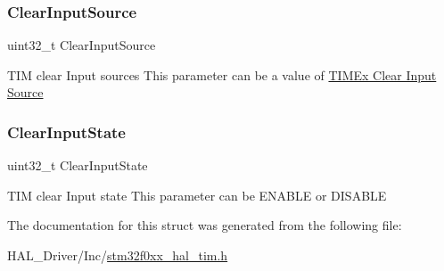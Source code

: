 \subsubsection{\texorpdfstring{Clear\+Input\+Source}{ClearInputSource}}
{\footnotesize\ttfamily uint32\+\_\+t Clear\+Input\+Source}

T\+IM clear Input sources This parameter can be a value of \hyperlink{group___t_i_m_ex___clock___clear___input___source}{T\+I\+M\+Ex Clear Input Source} \mbox{\label{struct_t_i_m___clear_input_config_type_def_ae375822fd9a07ebafaf13fc47db211db}} 
\subsubsection{\texorpdfstring{Clear\+Input\+State}{ClearInputState}}
{\footnotesize\ttfamily uint32\+\_\+t Clear\+Input\+State}

T\+IM clear Input state This parameter can be E\+N\+A\+B\+LE or D\+I\+S\+A\+B\+LE 

The documentation for this struct was generated from the following file\+:\begin{DoxyCompactItemize}
\item 
H\+A\+L\+\_\+\+Driver/\+Inc/\hyperlink{stm32f0xx__hal__tim_8h}{stm32f0xx\+\_\+hal\+\_\+tim.\+h}\end{DoxyCompactItemize}
